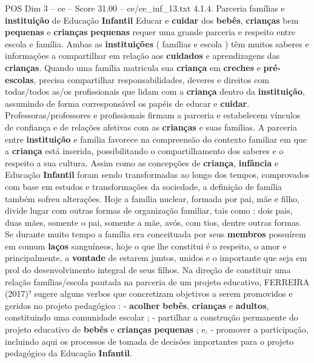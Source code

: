 \begin{textsample}{POS Dim 3 – ce – Score 31.00 – ce/ce\_inf\_13.txt}  \label{ex:f3_pos_052}
4.1.4.
Parceria famílias e \textbf{instituição} de Educação \textbf{Infantil} Educar e \textbf{cuidar} dos \textbf{bebês}, \textbf{crianças} bem \textbf{pequenas} e \textbf{crianças} \textbf{pequenas} requer uma grande parceria e respeito entre escola e família.
Ambas as \textbf{instituições} ( famílias e escola ) têm muitos saberes e informações a compartilhar em relação aos \textbf{cuidados} e aprendizagens das \textbf{crianças}.
Quando uma família matricula sua \textbf{criança} em \textbf{creches} e \textbf{pré-escolas}, precisa compartilhar responsabilidades, deveres e direitos com todas/todos as/os profissionais que lidam com a \textbf{criança} dentro da \textbf{instituição}, assumindo de forma corresponsável os papéis de educar e \textbf{cuidar}.
Professoras/professores e profissionais firmam a parceria e estabelecem vínculos de confiança e de relações afetivas com as \textbf{crianças} e suas famílias.
A parceria entre \textbf{instituição} e família favorece na compreensão do contexto familiar em que a \textbf{criança} está inserida, possibilitando o compartilhamento dos saberes e o respeito a sua cultura.
Assim como as concepções de \textbf{criança}, \textbf{infância} e Educação \textbf{Infantil} foram sendo transformadas ao longo dos tempos, comprovados com base em estudos e transformações da sociedade, a definição de família também sofreu alterações.
Hoje a família nuclear, formada por pai, mãe e filho, divide lugar com outras formas de organização familiar, tais como : dois pais, duas mães, somente o pai, somente a mãe, avós, com tios, dentre outras formas.
Se durante muito tempo a família era conceituada por seus \textbf{membros} possuírem em comum \textbf{laços} sanguíneos, hoje o que lhe constitui é o respeito, o amor e principalmente, a \textbf{vontade} de estarem juntos, unidos e o importante que seja em prol do desenvolvimento integral de seus filhos.
Na direção de constituir uma relação famílias/escola pautada na parceria de um projeto educativo, FERREIRA (2017)⁷ sugere alguns verbos que concretizam objetivos a serem promovidos e geridos no projeto pedagógico : - \textbf{acolher} \textbf{bebês}, \textbf{crianças} e \textbf{adultos}, constituindo uma comunidade escolar ; - partilhar a construção permanente do projeto educativo de \textbf{bebês} e \textbf{crianças} \textbf{pequenas} ; e, - promover a participação, incluindo aqui os processos de tomada de decisões importantes para o projeto pedagógico da Educação \textbf{Infantil}.

\end{textsample}
